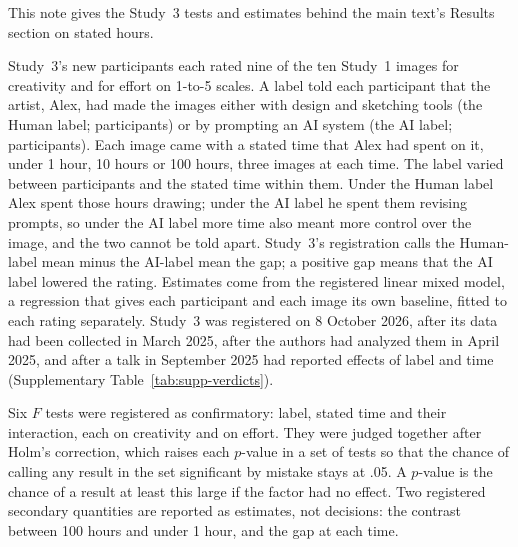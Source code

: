 
This note gives the Study~3 tests and estimates behind the main text's Results section on stated hours.

Study~3's \SThreeN{} new participants each rated nine of the ten Study~1 images for creativity and for effort on 1-to-5 scales. A label told each participant that the artist, Alex, had made the images either with design and sketching tools (the Human label; \SThreeNHuman{} participants) or by prompting an AI system (the AI label; \SThreeNAI{} participants). Each image came with a stated time that Alex had spent on it, under 1 hour, 10 hours or 100 hours, three images at each time. The label varied between participants and the stated time within them. Under the Human label Alex spent those hours drawing; under the AI label he spent them revising prompts, so under the AI label more time also meant more control over the image, and the two cannot be told apart. Study~3's registration calls the Human-label mean minus the AI-label mean the gap; a positive gap means that the AI label lowered the rating. Estimates come from the registered linear mixed model, a regression that gives each participant and each image its own baseline, fitted to each rating separately. Study~3 was registered on 8 October 2026, after its data had been collected in March 2025, after the authors had analyzed them in April 2025, and after a talk in September 2025 had reported effects of label and time (Supplementary Table~\ref{tab:supp-verdicts}).

Six $F$ tests were registered as confirmatory: label, stated time and their interaction, each on creativity and on effort. They were judged together after Holm's correction,\cite{holm1979simple} which raises each $p$-value in a set of tests so that the chance of calling any result in the set significant by mistake stays at .05. A $p$-value is the chance of a result at least this large if the factor had no effect. Two registered secondary quantities are reported as estimates, not decisions: the contrast between 100 hours and under 1 hour, and the gap at each time.

